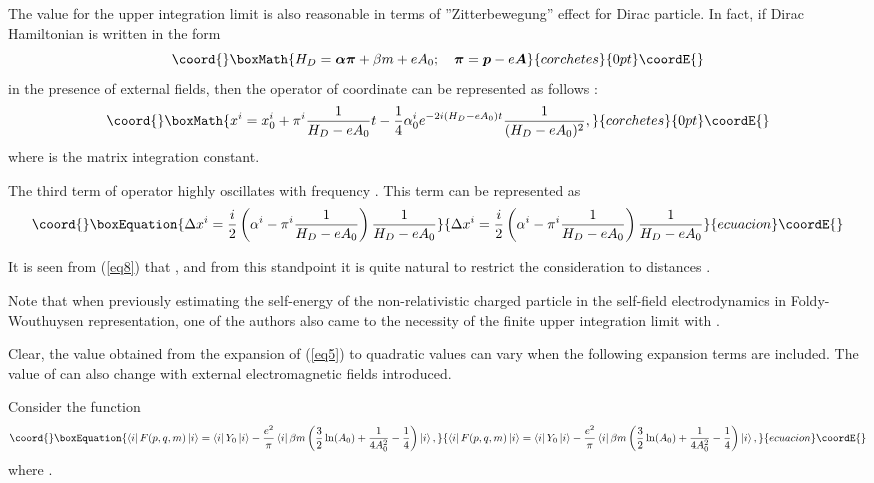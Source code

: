 \documentclass[a4paper,draft,showpacs,preprint,prd,aps]{revtex4}
\begin{document}
The value \coordHE{} for the upper integration limit is also reasonable
in terms of ''Zitterbewegung'' effect for Dirac particle. In fact, if Dirac
Hamiltonian is written in the form
\[\coord{}\boxMath{
H_D=\bm{\alpha}\bm{\pi} + \beta m + eA_0 ;\quad \bm{\pi} = \bm{p}-e\bm{A}
}{corchetes}{0pt}\coordE{}\]
in the presence of external fields, then the operator of coordinate
\coordHE{} can be represented as follows \cite{ref2}:
\[\coord{}\boxMath{
x^i = x_0^i + \pi^i\frac 1{H_D - eA_0}t -
\frac 14\alpha_0^i e^{-2i(H_D - eA_0)t}\frac 1{(H_D-eA_0)^2},
}{corchetes}{0pt}\coordE{}\]
where \coordHE{} is the matrix integration constant.

The third term of \coordHE{} operator highly oscillates with frequency
\coordHE{}. This term can be represented as
\begin{equation}\coord{}\boxEquation{
\label{eq8}
\Delta x^i = \frac i2\left(\alpha^i-\pi^i\frac 1{H_D - eA_0}\right)\frac
1{H_D - eA_0}
}{
\Delta x^i = \frac i2\left(\alpha^i-\pi^i\frac 1{H_D - eA_0}\right)\frac
1{H_D - eA_0}
}{ecuacion}\coordE{}\end{equation}

It is seen from (\ref{eq8}) that \coordHE{}, and from this
standpoint it is quite natural to restrict the consideration to distances
\coordHE{}.

Note that when previously estimating the self-energy of the non-relativistic
charged particle in the self-field electrodynamics in Foldy-Wouthuysen
representation, one of the authors also came to the necessity of the finite
upper integration limit with \coordHE{} \cite{ref3}.

Clear, the value \coordHE{} obtained from the expansion of (\ref{eq5}) to
quadratic values \coordHE{} can vary when the following
expansion terms are included. The value of \coordHE{} can also change with external
electromagnetic fields \coordHE{} introduced.

Consider the function
\begin{equation}\coord{}\boxEquation{
\label{eq9}
\left\langle i \right|F(p,q,m)\left| i \right\rangle =
\left\langle i \right|Y_0 \left| i \right\rangle - \frac {e^2}{\pi}
\left\langle i \right|\beta m \left( \frac 32\ln(A_0)+
\frac 1{4A_0^2}-\frac 14 \right)\left| {i} \right\rangle,
}{
\left\langle i \right|F(p,q,m)\left| i \right\rangle =
\left\langle i \right|Y_0 \left| i \right\rangle - \frac {e^2}{\pi}
\left\langle i \right|\beta m \left( \frac 32\ln(A_0)+
\frac 1{4A_0^2}-\frac 14 \right)\left| {i} \right\rangle,
}{ecuacion}\coordE{}\end{equation}
where \coordHE{}.
\end{document}
